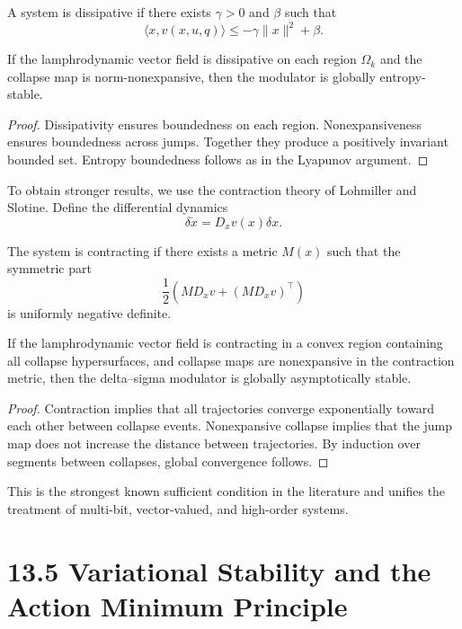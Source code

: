 A system is dissipative if there exists $\gamma>0$ and $\beta$ such that
\[
\langle x, v(x,u,q) \rangle \le -\gamma \|x\|^2 + \beta.
\]

\begin{theorem}
If the lamphrodynamic vector field is dissipative on each region $\Omega_k$ and the collapse map is norm-nonexpansive, then the modulator is globally entropy-stable.
\end{theorem}

\begin{proof}
Dissipativity ensures boundedness on each region. Nonexpansiveness ensures boundedness across jumps. Together they produce a positively invariant bounded set. Entropy boundedness follows as in the Lyapunov argument.
\end{proof}

To obtain stronger results, we use the contraction theory of Lohmiller and Slotine. Define the differential dynamics
\[
\delta \dot{x} = D_x v(x) \delta x.
\]

\begin{definition}
The system is contracting if there exists a metric $M(x)$ such that the symmetric part
\[
\frac{1}{2}(MD_x v + (MD_x v)^\top)
\]
is uniformly negative definite.
\end{definition}

\begin{theorem}
If the lamphrodynamic vector field is contracting in a convex region containing all collapse hypersurfaces, and collapse maps are nonexpansive in the contraction metric, then the delta--sigma modulator is globally asymptotically stable.
\end{theorem}

\begin{proof}
Contraction implies that all trajectories converge exponentially toward each other between collapse events. Nonexpansive collapse implies that the jump map does not increase the distance between trajectories. By induction over segments between collapses, global convergence follows.
\end{proof}

This is the strongest known sufficient condition in the literature and unifies the treatment of multi-bit, vector-valued, and high-order systems.

\section*{13.5 Variational Stability and the Action Minimum Principle}

